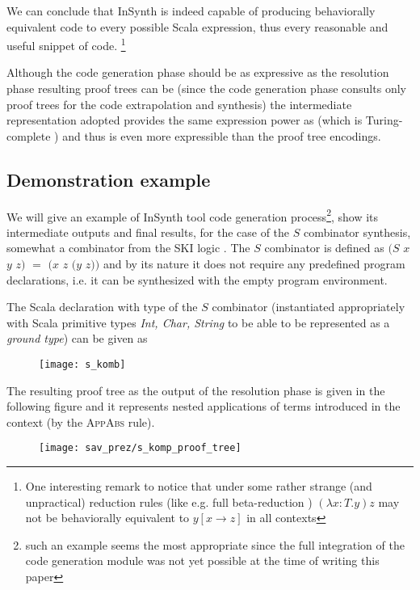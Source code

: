 We can conclude that InSynth is indeed capable of producing behaviorally equivalent code to every possible Scala expression, thus every reasonable and useful snippet of code.
\footnote{One interesting remark to notice that under some rather strange (and unpractical) reduction rules (like e.g. full beta-reduction \cite{Pierce:2002:TPL:509043}) $(\lambda x:T. y) z$ may not be behaviorally equivalent to $y[x \rightarrow z]$ in all contexts}

Although the code generation phase should be as expressive as the resolution phase resulting proof trees can be (since the code generation phase consults only proof trees for the code extrapolation and synthesis) the intermediate representation adopted provides the same expression power as \LC (which is Turing-complete \cite{odersky:scala,Pierce:2002:TPL:509043, Tromp:Lambda}) and thus is even more expressible than the proof tree encodings.

\subsection{Demonstration example}

We will give an example of InSynth tool code generation process\footnote{such an example seems the most appropriate since the full integration of the code generation module was not yet possible at the time of writing this paper}, show its intermediate outputs and final results, for the case of the $S$ combinator synthesis, somewhat a combinator from the SKI logic \cite{Tromp:Lambda}.
The $S$ combinator is defined as $(S$ $x$ $y$ $z)$ $=$ $(x$ $z$ $(y$ $z))$ and by its nature it does not require any predefined program declarations, i.e. it can be synthesized with the empty program environment.

The Scala declaration with type of the $S$ combinator (instantiated appropriately with Scala primitive types \textit{Int, Char, String} to be able to be represented as a \textit{ground type}) can be given as

\begin{figure}[ht]
\centering
\texttt{[image: s\_komb]}
\end{figure} 

The resulting proof tree as the output of the resolution phase is given in the following figure and it represents nested applications of terms introduced in the context (by the \textsc{AppAbs} rule).

\begin{figure}[ht]
\centering
\texttt{[image: sav\_prez/s\_komp\_proof\_tree]}
\end{figure} 

